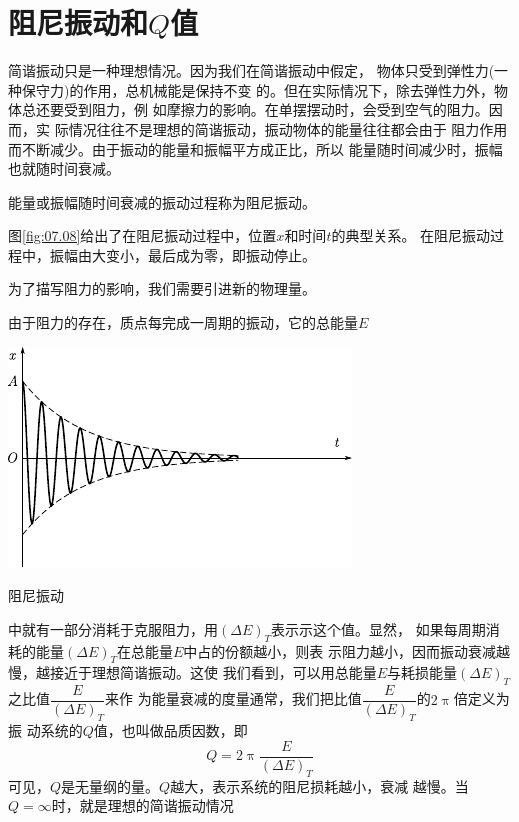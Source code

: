 \section{阻尼振动和$ Q $值}\label{sec:07.04}

简谐振动只是一种理想情况。因为我们在简谐振动中假定，
物体只受到弹性力(一种保守力)的作用，总机械能是保持不变
的。但在实际情况下，除去弹性力外，物体总还要受到阻力，例
如摩擦力的影响。在单摆摆动时，会受到空气的阻力。因而，实
际情况往往不是理想的简谐振动，振动物体的能量往往都会由于
阻力作用而不断减少。由于振动的能量和振幅平方成正比，所以
能量随时间减少时，振幅也就随时间衰减。

能量或振幅随时间衰减的振动过程称为阻尼振动。

图\ref{fig:07.08}\;给出了在阻尼振动过程中，位置$ x $和时间$ t $的典型关系。
在阻尼振动过程中，振幅由大变小，最后成为零，即振动停止。

为了描写阻力的影响，我们需要引进新的物理量。

由于阻力的存在，质点每完成一周期的振动，它的总能量$ E $
\begin{figurex}[t]
    \centering
    \includegraphics{figure/fig07.08}

    \caption{阻尼振动}
    \label{fig:07.08}
\end{figurex}%
中就有一部分消耗于克服阻力，用$ \left( \Delta E \right) _ { T } $表示示这个值。显然，
如果每周期消耗的能量$ \left( \Delta E \right) _ { T } $在总能量$ E $中占的份额越小，则表
示阻力越小，因而振动衰减越慢，越接近于理想简谐振动。这使
我们看到，可以用总能量$ E $与耗损能量$ \left( \Delta E \right) _ { T } $之比值$ \dfrac { E } { \left( \Delta E \right) _ { T } } $来作
为能量衰减的度量通常，我们把比值$ \dfrac { E } { \left( \Delta E \right) _ { T } } $的$ 2 \uppi $倍定义为振
动系统的$ Q $值，也叫做品质因数，即
\begin{equation}\label{eqn:07.04.01}
    Q = 2 \uppi \frac { E } { \left( \Delta E \right) _ { T } }
\end{equation}
可见，$ Q $是无量纲的量。$ Q $越大，表示系统的阻尼损耗越小，衰减
越慢。当$ Q = \infty $时，就是理想的简谐振动情况

